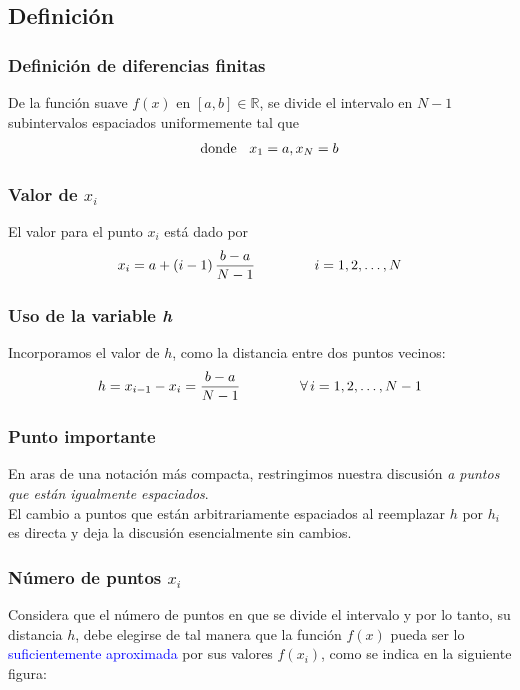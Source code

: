 \subsection{Definición}
\begin{frame}
\frametitle{Definición de diferencias finitas}
De la función suave $f(x)$ en $[a, b] \in \mathbb{R}$, se divide el intervalo en $N - 1$ subintervalos espaciados uniformemente tal que
\begin{align*}
[x_{i}, x_{i+1}] \hspace{0.5cm} \text{donde } \hspace{0.2cm} x_{1} = a, x_{N} = b
\end{align*}
\end{frame}
\begin{frame}
\frametitle{Valor de $x_{i}$}
El valor para el punto $x_{i}$ está dado por
\begin{align*}
x_{i} = a + (i - 1) \, \dfrac{b - a}{N - 1} \hspace{1.5cm} i = 1, 2, \ldots, N
\end{align*}
\end{frame}
\begin{frame}
\frametitle{Uso de la variable \textit{h}}
Incorporamos el valor de $h$, como la distancia entre dos puntos vecinos:
\begin{align*}
h = x_{i-1} - x_{i} = \dfrac{b - a}{N - 1} \hspace{1.5cm} \forall \, i = 1, 2, \ldots, N - 1
\end{align*}
\end{frame}
\begin{frame}
\frametitle{Punto importante}
En aras de una notación más compacta, restringimos nuestra discusión \emph{a puntos que están igualmente espaciados}.
\\
\bigskip
El cambio a puntos que están arbitrariamente espaciados al reemplazar $h$ por $h_{i}$ es directa y deja la discusión esencialmente sin cambios.
\end{frame}
\begin{frame}
\frametitle{Número de puntos $x_{i}$}
Considera que el número de puntos en que se divide el intervalo y por lo tanto, su distancia $h$, debe elegirse de tal manera que la función $f(x)$ pueda ser lo \textcolor{blue}{suficientemente aproximada} por sus valores $f(x_{i})$, como se indica en la siguiente figura:
\end{frame}
